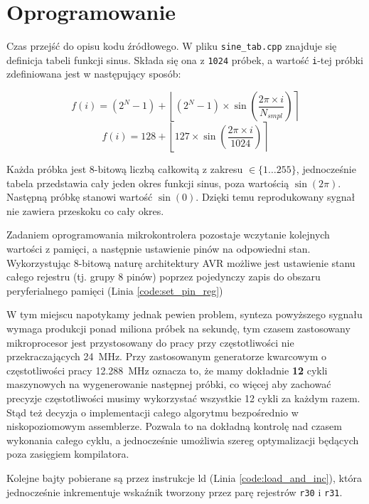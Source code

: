 \documentclass[12pt, a4paper]{article}
\begin{document}
\section{Oprogramowanie}
\label{sec:impl}
Czas przejść do opisu kodu źródłowego.
W pliku \verb|sine_tab.cpp| znajduje się definicja tabeli funkcji sinus. Składa się ona z \verb|1024| próbek, a wartość \verb|i|-tej próbki 
zdefiniowana jest w następujący sposób:

\begin{equation}
	f(i) = (2^N - 1) + \left\lfloor (2^N - 1) \times \sin \left(\frac{2 \pi \times i}{N_{smpl}}\right)\right\rceil
\end{equation}
\begin{equation}
	f(i) = 128 + \left\lfloor 127 \times \sin \left(\frac{2 \pi \times i}{1024}\right)\right\rceil
\end{equation}

Każda próbka jest 8-bitową liczbą całkowitą z zakresu $\in \{1 \dots 255\}$, jednocześnie tabela przedstawia cały jeden okres funkcji sinus,
poza wartością $\sin (2 \pi)$. Następną próbkę stanowi wartość $\sin (0)$. Dzięki temu reprodukowany sygnał nie zawiera przeskoku co cały okres.

Zadaniem oprogramowania mikrokontrolera pozostaje wczytanie kolejnych wartości z pamięci,
a następnie ustawienie pinów na odpowiedni stan. Wykorzystując 8-bitową naturę architektury AVR
możliwe jest ustawienie stanu całego rejestru (tj. grupy 8 pinów) poprzez pojedynczy zapis do 
obszaru peryferialnego pamięci (Linia \ref{code:set_pin_reg})

W tym miejscu napotykamy jednak pewien problem, synteza powyższego sygnału wymaga produkcji ponad miliona próbek na sekundę,
tym czasem zastosowany mikroprocesor jest przystosowany do pracy przy częstotliwości nie przekraczających \qty{24}{\MHz}.
Przy zastosowanym generatorze kwarcowym o częstotliwości pracy \qty{12,288}{\MHz} oznacza to, że mamy dokładnie \textbf{12} cykli maszynowych
na wygenerowanie następnej próbki, co więcej aby zachować precyzje częstotliwości musimy wykorzystać wszystkie 12 cykli za każdym razem.
Stąd też decyzja o implementacji całego algorytmu bezpośrednio w niskopoziomowym assemblerze.
Pozwala to na dokładną kontrolę nad czasem wykonania całego cyklu, a jednocześnie umożliwia szereg optymalizacji
będących poza zasięgiem kompilatora.

Kolejne bajty pobierane są przez instrukcje ld (Linia \ref{code:load_and_inc}), która jednocześnie
inkrementuje wskaźnik tworzony przez parę rejestrów \verb|r30| i \verb|r31|.
\end{document}
